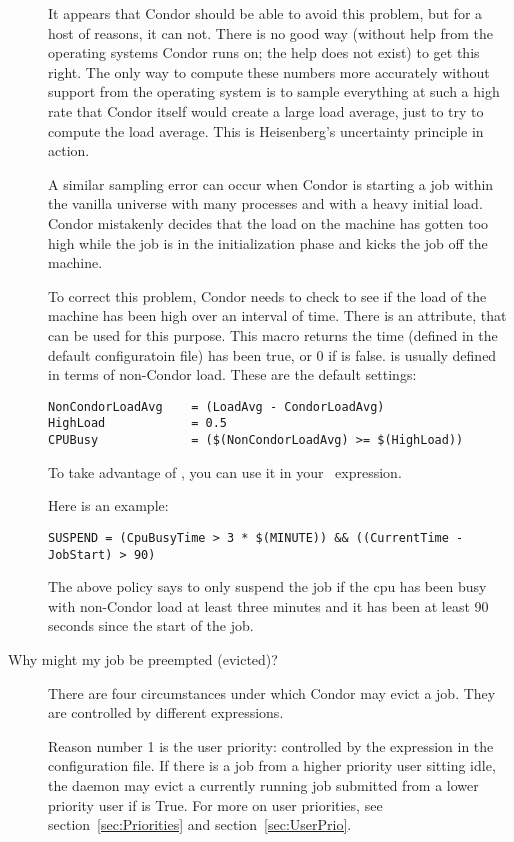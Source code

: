 \begin{description}
It appears that Condor should be able to avoid this problem, but for a
host of reasons, it can not.  
There is no good way (without help from the operating systems Condor runs on;
the help does not exist) to get this right.
The only way to compute these numbers more accurately
without support from the operating system is to sample everything at
such a high rate that Condor itself would create a large load average,
just to try to compute the load average.
This is Heisenberg's uncertainty principle in action.

A similar sampling error can occur when Condor is starting a job
within the vanilla universe with many processes and with a
heavy initial load.
Condor mistakenly decides that the load on the machine has gotten too
high while the job is in the initialization phase and kicks the job off
the machine.

To correct this problem, Condor needs to check to see if the load of the
machine has been high over an interval of time.
There is an attribute,  that can be used for
this purpose.
This macro returns the time  (defined in the default
configuratoin file) has been true, or 0 if  is false.
 is usually defined in terms of non-Condor load.
These are the default settings:

\begin{verbatim}
NonCondorLoadAvg    = (LoadAvg - CondorLoadAvg)
HighLoad            = 0.5
CPUBusy             = ($(NonCondorLoadAvg) >= $(HighLoad))
\end{verbatim}

To take advantage of , you can use it in your
\ expression. 

Here is an example:
\begin{verbatim}
SUSPEND = (CpuBusyTime > 3 * $(MINUTE)) && ((CurrentTime - JobStart) > 90)
\end{verbatim}

The above policy says to only suspend the job if the cpu has been busy
with non-Condor load at least three minutes and it has been at least 90
seconds since the start of the job.


\item[Why might my job be preempted (evicted)?]

There are four circumstances under which Condor may evict a job.
They are controlled by different expressions.

Reason number 1 is the user priority:
controlled by the 
expression in the configuration file.
If there is a job from a 
higher priority user sitting idle,
the  daemon may evict 
a currently running job submitted from a lower priority user if 
 is True.
For more on user priorities,
see section~\ref{sec:Priorities} and
section~\ref{sec:UserPrio}.


\end{description}
